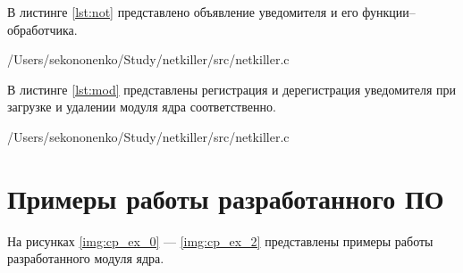 В листинге \ref{lst:not} представлено объявление уведомителя и его функции--обработчика.

\begin{lstinputlisting}[
	caption={Уведомитель для USB--устройств},
	label={lst:not},
	style={c},
	linerange={168-190},
	]{/Users/sekononenko/Study/netkiller/src/netkiller.c}
\end{lstinputlisting}

В листинге \ref{lst:mod} представлены регистрация и дерегистрация уведомителя при загрузке и удалении модуля ядра соответственно.

\begin{lstinputlisting}[
	caption={Регистрация и дерегистрация уведомителя},
	label={lst:mod},
	style={c},
	linerange={192-205},
	]{/Users/sekononenko/Study/netkiller/src/netkiller.c}
\end{lstinputlisting}

\section{Примеры работы разработанного ПО}

На рисунках \ref{img:cp_ex_0} --- \ref{img:cp_ex_2} представлены примеры работы разработанного модуля ядра.



